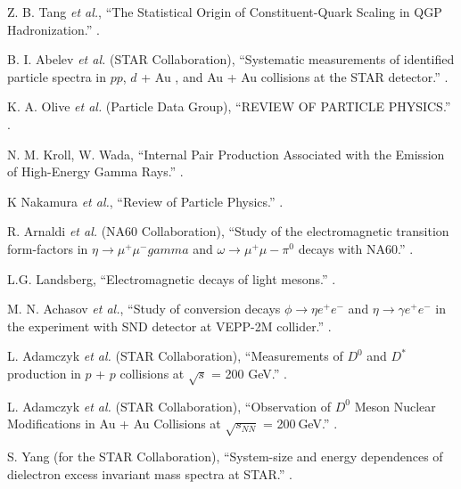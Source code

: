 \begin{thebibliography}{10}
Z. B. Tang {\it et al.},
\newblock ``The Statistical Origin of Constituent-Quark Scaling in QGP Hadronization.''
.

B. I. Abelev {\it et al.} (STAR Collaboration),
\newblock ``Systematic measurements of identified particle spectra in $pp$, $d$ + Au , and
Au + Au collisions at the STAR detector.''
.

K. A. Olive {\it et al.} (Particle Data Group),
\newblock ``REVIEW OF PARTICLE PHYSICS.''
.

N. M. Kroll, W. Wada,
\newblock ``Internal Pair Production Associated with the Emission of High-Energy Gamma Rays.''
.

K Nakamura {\it et al.},
\newblock ``Review of Particle Physics.''
.

R. Arnaldi {\it et al.} (NA60 Collaboration),
\newblock ``Study of the electromagnetic transition form-factors in $\eta \rightarrow \mu^{+}\mu^{-}gamma$ and $\omega \rightarrow \mu^{+}\mu{-}\pi^{0}$ decays with NA60.''
.

L.G. Landsberg,
\newblock ``Electromagnetic decays of light mesons.''
.

M. N. Achasov {\it et al.},
\newblock ``Study of conversion decays $\phi \rightarrow \eta e^{+}e^{-}$ and $\eta \rightarrow \gamma e^{+}e^{-}$ in the experiment with SND detector at VEPP-2M collider.''
.

L. Adamczyk {\it et al.} (STAR Collaboration),
\newblock ``Measurements of $D^{0}$ and $D^{*}$ production in $p$ + $p$ collisions at $\sqrt{s}$ = 200 GeV.''
.

L. Adamczyk {\it et al.} (STAR Collaboration),
\newblock ``Observation of $D^{0}$ Meson Nuclear Modifications in Au + Au Collisions at $\sqrt{s_{NN}}$ = 200 GeV.''
.

S. Yang (for the STAR Collaboration),
\newblock ``System-size and energy dependences of dielectron excess invariant mass spectra at STAR.''
.


\end{thebibliography}
